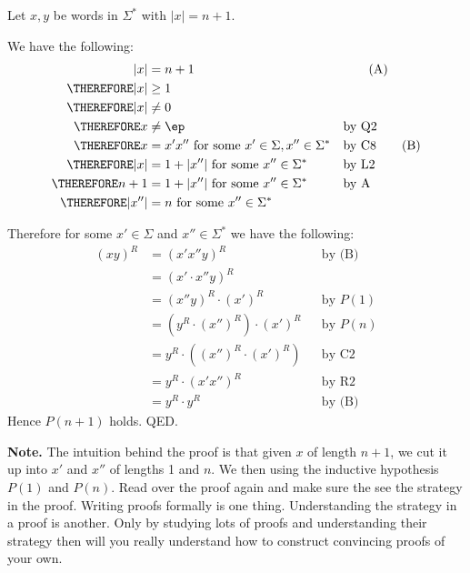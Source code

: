 Let $x,y$ be words in $\Sigma^*$ with $|x| = n + 1$.

We have the following:
\begin{align*}
           |x| &= n + 1  & & \tag{A} \\ 
\THEREFORE |x| &\geq 1 \\
\THEREFORE |x| &\neq 0 \\
\THEREFORE x &\neq \ep & & \text{by Q2} \\
\THEREFORE x &= x'x'' \text{ for some } x' \in \Sigma, x'' \in \Sigma^* 
           & & \text{by C8} 
           \tag{B} \\
\THEREFORE |x| &= 1 + |x''| \text{ for some } x'' \in \Sigma^*
           & & \text{by L2} \\
\THEREFORE n + 1 &= 1 + |x''| \text{ for some } x'' \in \Sigma^*
           & & \text{by A} \\
\THEREFORE |x''| &= n \text{ for some } x'' \in \Sigma^*
\end{align*}

Therefore for some $x' \in \Sigma$ and $x'' \in \Sigma^*$
we have the following:
\begin{align*}
(xy)^R
&= (x'x'' y)^R                                   & & \text{by (B)} \\
&= (x' \cdot x''y)^R                                               \\
&= (x''y)^R \cdot (x')^R                         & & \text{by $P(1)$}\\
&= \left( y^R \cdot (x'')^R \right) \cdot (x')^R & & \text{by $P(n)$} \\
&= y^R \cdot \left( (x'')^R \cdot (x')^R \right) & & \text{by C2}\\
&= y^R \cdot \left( x'x'' \right)^R              & & \text{by R2}\\
&= y^R \cdot y^R                                & & \text{by (B)} 
\end{align*}
Hence $P(n+1)$ holds.
QED.


{\bf Note.}
The intuition behind the proof is that 
given $x$ of length $n + 1$,
we cut it up into $x'$ and $x''$ of lengths 1 and $n$.
We then using the inductive hypothesis $P(1)$ and $P(n)$.
Read over the proof again and make sure the see the strategy
in the proof.
Writing proofs formally is one thing.
Understanding the strategy in a proof is another.
Only by studying lots of proofs and understanding their strategy
then will you really understand how to construct convincing proofs
of your own.
